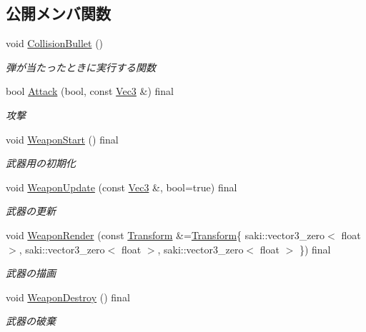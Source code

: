 \subsection*{公開メンバ関数}
\begin{DoxyCompactItemize}
\item 
void \mbox{\hyperlink{class_arrow_afe567fd69597c0a5c44edd99c06d6f71}{Collision\+Bullet}} ()
\begin{DoxyCompactList}\small\item\em 弾が当たったときに実行する関数 \end{DoxyCompactList}\item 
bool \mbox{\hyperlink{class_arrow_a98ea469bf0b21635b2d2dadb69c72240}{Attack}} (bool, const \mbox{\hyperlink{common_8h_ab1cb35b3a17c398d8ef71d5f779808bf}{Vec3}} \&) final
\begin{DoxyCompactList}\small\item\em 攻撃 \end{DoxyCompactList}\item 
void \mbox{\hyperlink{class_arrow_a085b5bd5f9e3ce25a081b502f9989f33}{Weapon\+Start}} () final
\begin{DoxyCompactList}\small\item\em 武器用の初期化 \end{DoxyCompactList}\item 
void \mbox{\hyperlink{class_arrow_afb6110035cba7b850d12755570163b29}{Weapon\+Update}} (const \mbox{\hyperlink{common_8h_ab1cb35b3a17c398d8ef71d5f779808bf}{Vec3}} \&, bool=true) final
\begin{DoxyCompactList}\small\item\em 武器の更新 \end{DoxyCompactList}\item 
void \mbox{\hyperlink{class_arrow_af9e54760156a77a15ad98a88f712ebdb}{Weapon\+Render}} (const \mbox{\hyperlink{common_8h_a1c43cb8f0d8a41901f3ce4c67dbbce20}{Transform}} \&=\mbox{\hyperlink{common_8h_a1c43cb8f0d8a41901f3ce4c67dbbce20}{Transform}}\{ saki\+::vector3\+\_\+zero$<$ float $>$, saki\+::vector3\+\_\+zero$<$ float $>$, saki\+::vector3\+\_\+zero$<$ float $>$ \}) final
\begin{DoxyCompactList}\small\item\em 武器の描画 \end{DoxyCompactList}\item 
void \mbox{\hyperlink{class_arrow_a1101d1159771b5c428afd3c7a6a0a4df}{Weapon\+Destroy}} () final
\begin{DoxyCompactList}\small\item\em 武器の破棄 \end{DoxyCompactList}\end{DoxyCompactItemize}
